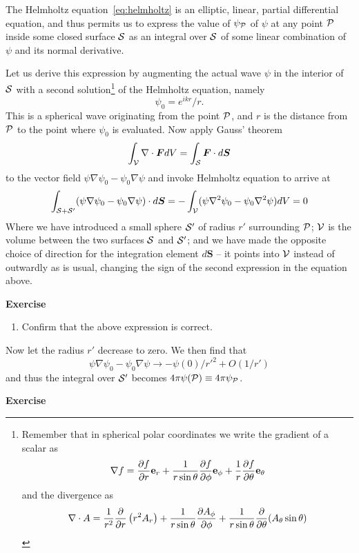 \documentclass{article}
\def\cl#1{{\cal #1}}               %
\begin{document}
The Helmholtz equation~\ref{eq:helmholtz} is an elliptic, linear, partial differential equation,
and thus permits us to express the value of $\psi_\cl{P}$ of $\psi$ at any point $\cl{P}$ inside
some closed surface $\cl{S}$ as an integral over $\cl{S}$ of some linear combination of $\psi$ 
and its normal derivative. 

Let us derive this expression by augmenting the actual wave $\psi$ in the interior of $\cl{S}$
with a second solution\footnote{Remember that in spherical polar coordinates we
write the gradient of a scalar as 
\[
\nabla f={\partial f\over\partial r}{\bf e}_r
     +{1\over r\sin\theta}{\partial f\over\partial\phi}{\bf e}_\phi
     +{1\over r}{\partial f\over\partial\theta}{\bf e}_\theta
\] 
and the divergence as 
\[
{\nabla\cdot A}={1\over r^2}{\partial\over\partial r}\left(r^2A_r\right)
+{1\over r\sin\theta}{\partial A_\phi\over\partial\phi}
+{1\over r\sin\theta}{\partial\over\partial\theta}(A_\theta\sin\theta)
\]} of the Helmholtz equation, namely
\[
\psi_0={e^{ikr}/r}.
\]
This is a spherical wave originating from the point $\cl{P}$, and $r$ is the distance from 
$\cl{P}$ to the point where $\psi_0$ is evaluated. Now apply Gauss' theorem 
\[
\int_\cl{V}\nabla\cdot{\bm F}dV=\int_\cl{S}{\bm F}\cdot d{\bm S}
\]
to the vector field $\psi\nabla\psi_0-\psi_0\nabla\psi$ and invoke Helmholtz equation to 
arrive at 
\[
\int_{\cl{S}+\cl{S}'}(\psi\nabla\psi_0-\psi_0\nabla\psi)\cdot d{\bm S}
           =-\int_\cl{V}(\psi\nabla^2\psi_0-\psi_0\nabla^2\psi)dV=0
\]
Where we have introduced a small sphere $\cl{S}'$ of radius $r'$ surrounding $\cl{P}$; $\cl{V}$
is the volume between the two surfaces $\cl{S}$ and $\cl{S}'$; and we have made the opposite 
choice of direction for the integration element $d{\bm S}$ -- it points into $\cl{V}$ instead
of outwardly as is usual, changing the sign of the second expression in the equation above. 

{\bf Exercise}

\begin{enumerate}
\item Confirm that the above expression is correct.
\setcounter{count}{\value{enumi}} 
\end{enumerate}

Now let the radius $r'$ decrease to zero. We then find that 
\[
\psi\nabla\psi_0-\psi_0\nabla\psi\rightarrow {-\psi(0)/{r'}^2}+O({1/r'})
\]
and thus the integral over $\cl{S}'$ becomes $4\pi\psi(\cl{P})\equiv
4\pi\psi_\cl{P}$. 

{\bf Exercise}
\end{document}
